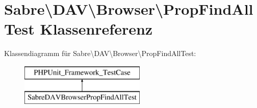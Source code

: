 \hypertarget{class_sabre_1_1_d_a_v_1_1_browser_1_1_prop_find_all_test}{}\section{Sabre\textbackslash{}D\+AV\textbackslash{}Browser\textbackslash{}Prop\+Find\+All\+Test Klassenreferenz}
\label{class_sabre_1_1_d_a_v_1_1_browser_1_1_prop_find_all_test}
Klassendiagramm für Sabre\textbackslash{}D\+AV\textbackslash{}Browser\textbackslash{}Prop\+Find\+All\+Test\+:\begin{figure}[H]
\begin{center}
\leavevmode
\includegraphics[height=2.000000cm]{class_sabre_1_1_d_a_v_1_1_browser_1_1_prop_find_all_test}
\end{center}
\end{figure}
